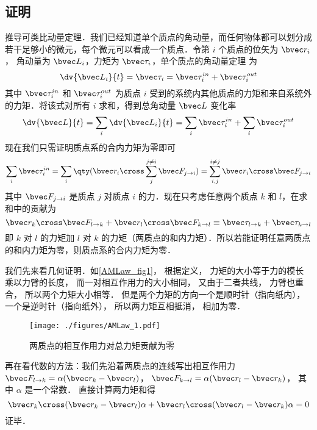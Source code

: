 \subsection{证明}
推导可类比动量定理．我们已经知道单个质点的角动量，而任何物体都可以划分成若干足够小的微元，每个微元可以看成一个质点．令第 $i$ 个质点的位矢为 $\bvec r_i$， 角动量为 $\bvec L_i$，力矩为 $\bvec \tau_i$，单个质点的角动量定理 为
\begin{equation}
\dv{\bvec L_i}{t} = \bvec \tau_i = \bvec \tau_i^{in} + \bvec \tau_i^{out}
\end{equation}
其中 $\bvec \tau_i^{in}$ 和 $\bvec \tau_i^{out}$ 为质点 $i$ 受到的系统内其他质点的力矩和来自系统外的力矩．将该式对所有 $i$ 求和，得到总角动量 $\bvec L$ 变化率
\begin{equation}
\dv{\bvec L}{t} =\sum_i\dv{\bvec L_i}{t} = \sum_i\bvec \tau_i^{in} + \sum_i\bvec \tau_i^{out}
\end{equation}
现在我们只需证明质点系的合内力矩为零即可
\begin{equation}
\sum_i\bvec \tau_i^{in} = \sum_i \qty(\bvec r_i\cross\sum_j^{j\ne i}\bvec F_{j\to i}) = \sum_{i,j}^{i\ne j} \bvec r_i\cross\bvec F_{j\to i}
\end{equation}
其中 $\bvec F_{j\to i}$ 是质点 $j$ 对质点 $i$ 的力．现在只考虑任意两个质点 $k$ 和 $l$，在求和中的贡献为
\begin{equation}
\bvec r_k\cross\bvec F_{l\to k} + \bvec r_l\cross\bvec F_{k\to l} \equiv \bvec \tau_{l\to k}+ \bvec \tau_{k\to l}
\end{equation}
即 $k$ 对 $l$ 的力矩加 $l$ 对 $k$ 的力矩（两质点的和内力矩）．所以若能证明任意两质点的和内力矩为零，则质点系的合内力矩为零．

我们先来看几何证明．如\autoref{AMLaw_fig1}， 根据定义， 力矩的大小等于力的模长乘以力臂的长度， 而一对相互作用力的大小相同， 又由于二者共线， 力臂也重合， 所以两个力矩大小相等． 但是两个力矩的方向一个是顺时针（指向纸内）， 一个是逆时针（指向纸外）， 所以两力矩互相抵消， 相加为零．

\begin{figure}[ht]
\centering
\texttt{[image: ./figures/AMLaw\_1.pdf]}
\caption{两质点的相互作用力对总力矩贡献为零}\label{AMLaw_fig1}
\end{figure}

再在看代数的方法：我们先沿着两质点的连线写出相互作用力 $\bvec F_{l\to k} = \alpha(\bvec r_k - \bvec r_l)$， $\bvec F_{k\to l} = \alpha(\bvec r_l - \bvec r_k)$， 其中 $\alpha$ 是一个常数． 直接计算两力矩和得
\begin{equation}
\bvec r_k \cross (\bvec r_k - \bvec r_l)\alpha + \bvec r_l \cross (\bvec r_l - \bvec r_k)\alpha = 0
\end{equation}
证毕．
